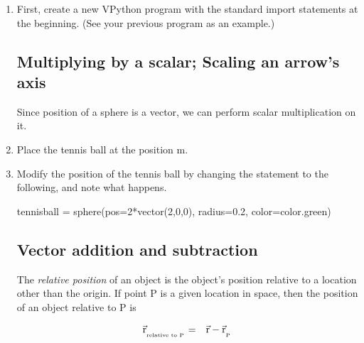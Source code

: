 \begin{enumerate}

	\item First, create a new VPython program with the standard import statements at the beginning. (See your previous program as an example.)

	\subsection*{Multiplying by a scalar; Scaling an arrow's axis}

Since position of a sphere is a vector, we can perform scalar multiplication on it.

	\item Place the tennis ball at the position  m.

	\item Modify the position of the tennis ball by changing the statement to the following, and note what happens.
	
\begin{myvpython}
tennisball = sphere(pos=2*vector(2,0,0), radius=0.2, color=color.green)
\end{myvpython}


	\subsection*{Vector addition and subtraction}

The \emph{relative position} of an object is the object's position relative to a location other than the origin. If point P is a given location in space, then the position of an object relative to P is

\begin{eqnarray*}
	\vec{\mathrm{r}}_{_{_{\mbox{\tiny{relative to P}}}}} & = & \vec{\mathrm{r}} - \vec{\mathrm{r}}_{_{_{\mbox{\tiny{P}}}}} \\
\end{eqnarray*}


\end{enumerate}
